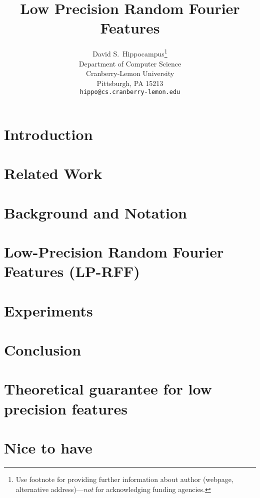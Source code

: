 \documentclass{article}
\title{Low Precision Random Fourier Features}
\author{
  David S.~Hippocampus\thanks{Use footnote for providing further
    information about author (webpage, alternative
    address)---\emph{not} for acknowledging funding agencies.} \\
  Department of Computer Science\\
  Cranberry-Lemon University\\
  Pittsburgh, PA 15213 \\
  \texttt{hippo@cs.cranberry-lemon.edu} \\
}
\begin{document}

\maketitle

\begin{abstract}

\end{abstract}

\section{Introduction}
\label{sec:intro}


\section{Related Work}
\label{sec:relwork}


\section{Background and Notation}
\label{sec:background}


%

\section{Low-Precision Random Fourier Features (LP-RFF)}
\label{sec:lprff}


\section{Experiments}
\label{sec:experiments}


\section{Conclusion}
\label{sec:conclusion}




%

%

\clearpage

\appendix

\section{Theoretical guarantee for low precision features}
\label{sec:lprff_theory_appendix}


\section{Nice to have}
\label{sec:nicetohave}

\end{document}
